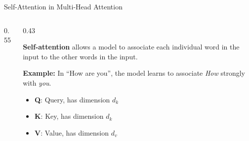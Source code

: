 \documentclass[aspectratio=169,xcolor=dvipsnames,svgnames,x11names,fleqn]{beamer}
\begin{document}
\begin{frame}[fragile]{Self-Attention in Multi-Head Attention}
\begin{columns}[T]
\begin{column}{0.55\textwidth}
        \end{column}

        \begin{column}{0.43\textwidth}
            \begin{tcolorbox}[colback=blue!5, colframe=blue!40, fonttitle=\bfseries\small, fontupper=\small]
                \textbf{Self-attention} allows a model to associate each individual word in the input to the other words in the input.
            \end{tcolorbox}

            \vspace{0.3cm}
            
            \begin{tcolorbox}[colback=orange!5, colframe=orange!40, fontupper=\scriptsize]
                \textbf{Example:} In ``How are you'', the model learns to associate \textit{How} strongly with \textit{you}.
            \end{tcolorbox}

            \vspace{0.2cm}
            
            \begin{itemize}
                \item \textbf{Q}: Query, has dimension $d_k$
                \item \textbf{K}: Key, has dimension $d_k$
                \item \textbf{V}: Value, has dimension $d_v$
            \end{itemize}
        \end{column}
    \end{columns}
\end{frame}
\end{document}
